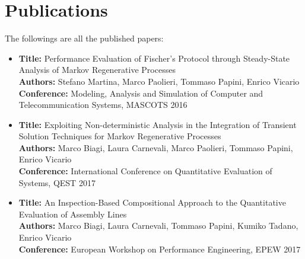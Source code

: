 
\section*{Publications}

  The followings are all the published papers:
  
  \begin{itemize}
    \item
      \textbf{Title:} Performance Evaluation of Fischer's Protocol through Steady-State Analysis of Markov Regenerative Processes \cite{martina2016performance}\\
      \textbf{Authors:} Stefano Martina, Marco Paolieri, Tommaso Papini, Enrico Vicario\\
      \textbf{Conference:} Modeling, Analysis and Simulation of Computer and Telecommunication Systems, \ac{MASCOTS} 2016
    \item
      \textbf{Title:} Exploiting Non-deterministic Analysis in the Integration of Transient Solution Techniques for Markov Regenerative Processes \cite{biagi2017exploiting}\\
      \textbf{Authors:} Marco Biagi, Laura Carnevali, Marco Paolieri, Tommaso Papini, Enrico Vicario\\
      \textbf{Conference:} International Conference on Quantitative Evaluation of Systems, \ac{QEST} 2017
    \item
      \textbf{Title:} An Inspection-Based Compositional Approach to the Quantitative Evaluation of Assembly Lines \cite{biagi2017inspection}\\
      \textbf{Authors:} Marco Biagi, Laura Carnevali, Tommaso Papini, Kumiko Tadano, Enrico Vicario\\
      \textbf{Conference:} European Workshop on Performance Engineering, \ac{EPEW} 2017
  \end{itemize}

\newpage
